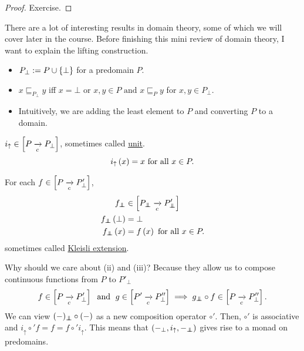 \begin{enumcirc}
	\begin{proof}
		Exercise.
	\end{proof}
	\item
	There are a lot of interesting results in domain theory, some of which we will
	cover later in the course.
	Before finishing this mini review of domain theory, I want to explain the
	lifting construction.
	\begin{enumrm}
		\item
		\begin{itemize}
			\item
			      $P_\bot := P \cup \left\{ \bot \right\}$ for a predomain $P$.
			\item
			      $x \sqsubseteq_{P_\bot} y$ iff $x = \bot$ or $x, y \in P \textrm{ and } x \sqsubseteq_P y$
			      for $x, y \in P_\bot$.
			\item
			      Intuitively, we are adding the least element to $P$ and converting $P$ to a
			      domain.
		\end{itemize}
		\item
		$i_\uparrow \in \left[ P \xrightarrow[c]{} P_\bot \right]$, sometimes called \ul{unit}.
		\[
			i_\uparrow \left( x \right) = x \textrm{ for all } x \in P.
		\]
		\item
		For each $f \in \left[ P \xrightarrow[c]{} P'_\bot \right]$,
		\begin{align*}
			f_\doublebot              & \in \brackets{P_\doublebot \toc P'_\doublebot} \\
			f_\doublebot \prths{\bot} & = \bot                                         \\
			f_\doublebot \prths{x}    & = f \prths{x} \textrm{ for all } x \in P.
		\end{align*}
		sometimes called \ul{Kleisli extension}.
		\item
		Why should we care about (ii) and (iii)?
		Because they allow us to compose continuous functions from $P$ to $P'_\bot$
		\[
			f \in \left[ P \xrightarrow[c]{} P'_\bot \right] \; \textrm{ and } \;
			g \in \left[ P' \xrightarrow[c]{} P''_\bot \right] \implies
			g_{\bot \mkern-11mu \bot} \circ f \in \left[ P \xrightarrow[c]{} P''_\bot \right].
		\]
		We can view $(-)_{\bot \mkern-11mu \bot} \circ (-)$ as a new composition operator $\circ'$.
		Then, $\circ'$ is associative and $i_\uparrow \circ' f = f = f \circ'
			i_\uparrow$.
		This means that $\left( -_\bot, i_\uparrow, -_{\bot \mkern-11mu \bot} \right)$ gives rise to a
		monad on predomains.
	\end{enumrm}
\end{enumcirc}

